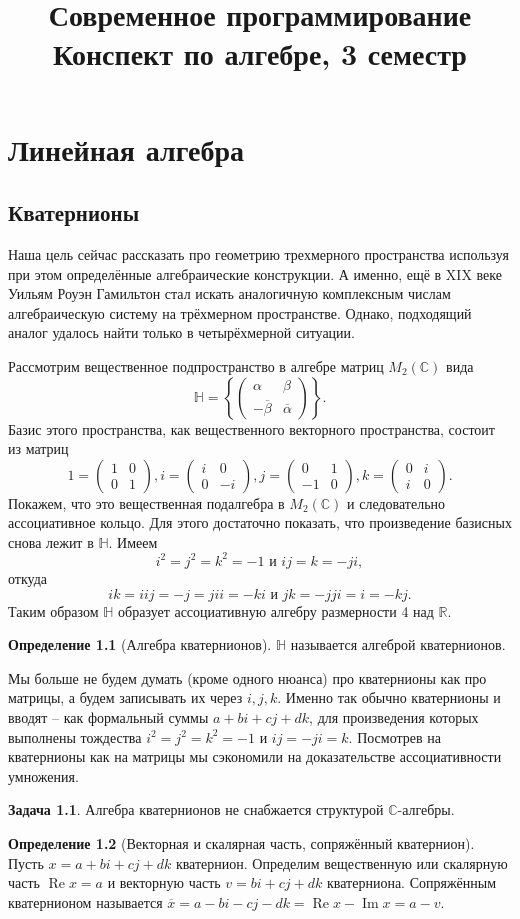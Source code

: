 \documentclass[12pt,a4paper,oneside]{book}
\title{Современное программирование \\ 
Конспект по алгебре, 3 семестр}
\date{}
\theoremstyle{definition}
\newtheorem{zad}{\color{violet!100!black}Задача}
\newtheorem*{defn}{\color{yellow!30!red} Определение}
\renewcommand{\Re}{\operatorname{Re}}
\newcommand{\ovl}{\overline}
\renewcommand{\Im}{\operatorname{Im}}
\newcommand{\R}{\mathbb R}
\renewcommand{\C}{\mathbb C}
\renewcommand{\H}{\mathbb H}
\def\dfn{\begin{defn}}
\def\edfn{\end{defn}}
\def\zd{\begin{zad}}
\def\ezd{\end{zad}}
\def\pmat{\begin{pmatrix}}
\def\epmat{\end{pmatrix}}
\begin{document}
\tableofcontents

\chapter{Линейная алгебра}

\section{Кватернионы}


Наша цель сейчас рассказать про геометрию трехмерного пространства используя при этом определённые алгебраические конструкции. А именно, ещё в XIX веке Уильям Роуэн Гамильтон стал искать аналогичную комплексным числам алгебраическую систему на трёхмерном пространстве.  
Однако, подходящий аналог удалось найти только в четырёхмерной ситуации.


Рассмотрим вещественное подпространство в алгебре матриц $M_2(\C)$ вида
$$\H = \left\{\pmat \alpha & \beta \\ -\ovl{\beta} & \ovl{\alpha} \epmat \right\}.$$
Базис этого пространства, как вещественного векторного пространства, состоит из матриц 
$$ 1=\pmat 1 & 0 \\ 0& 1 \epmat, i= \pmat i & 0 \\ 0& -i \epmat, j=\pmat 0& 1 \\ -1 & 0 \epmat, k=\pmat 0 & i \\ i & 0\epmat. $$ 
Покажем, что это вещественная подалгебра в $M_2(\C)$ и следовательно ассоциативное кольцо. 
Для этого достаточно показать, что произведение базисных снова лежит в $\H$. Имеем $$i^2=j^2=k^2=-1 \text{ и } ij=k=-ji,$$ откуда $$ik= iij=-j=jii=-ki \text{ и } jk=-jji=i=-kj.$$ Таким образом $\H$ образует ассоциативную алгебру размерности 4 над $\R$.
 
\dfn[Алгебра кватернионов] $\H$ называется алгеброй кватернионов. 
\edfn
Мы больше не будем думать (кроме одного нюанса) про кватернионы как про матрицы, а будем записывать их через $i,j,k$. Именно так обычно кватернионы и вводят -- как формальный суммы $a+bi+cj+dk$, для произведения которых выполнены тождества $i^2=j^2=k^2=-1$ и $ij=-ji=k$. Посмотрев на кватернионы как на матрицы мы сэкономили на доказательстве ассоциативности умножения.

\zd Алгебра кватернионов не снабжается структурой $\C$-алгебры.
\ezd






\dfn[Векторная и скалярная часть, сопряжённый кватернион] Пусть $x= a+bi+cj+dk$ кватернион. Определим вещественную или скалярную часть $\Re x=a$ и векторную часть $v= bi+cj+dk$ кватерниона. Сопряжённым кватернионом называется $\ovl{x}= a-bi-cj-dk= \Re x - \Im x =a-v$. 
\edfn
\end{document}

